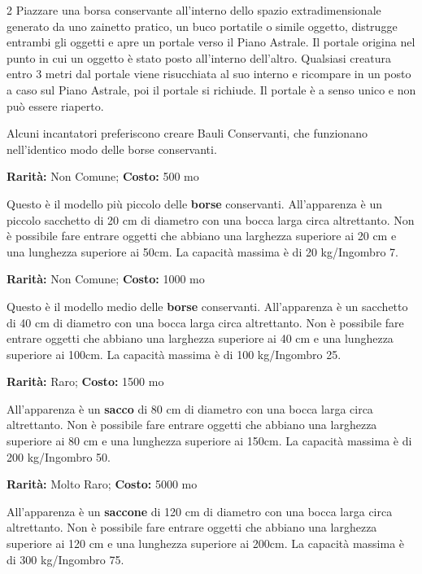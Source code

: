 \begin{multicols}{2}
Piazzare una borsa conservante all'interno dello spazio extradimensionale generato da uno zainetto pratico, un buco portatile o simile oggetto, distrugge entrambi gli oggetti e apre un portale verso il Piano Astrale. Il portale origina nel punto in cui un oggetto è stato posto all'interno dell'altro. Qualsiasi creatura entro 3 metri dal portale viene risucchiata al suo interno e ricompare in un posto a caso sul Piano Astrale, poi il portale si richiude. Il portale è a senso unico e non può essere riaperto.

Alcuni incantatori preferiscono creare Bauli Conservanti, che funzionano nell'identico modo delle borse conservanti.


\textbf{Rarità:} Non Comune; \textbf{Costo:} 500 mo

Questo è il modello più piccolo delle \textbf{borse} conservanti. All'apparenza è un piccolo sacchetto di 20 cm di diametro con una bocca larga circa altrettanto.
Non è possibile fare entrare oggetti che abbiano una larghezza superiore ai 20 cm e una lunghezza superiore ai 50cm.
La capacità massima è di 20 kg/Ingombro 7.


\textbf{Rarità:} Non Comune; \textbf{Costo:} 1000 mo

Questo è il modello medio delle \textbf{borse} conservanti. All'apparenza è un sacchetto di 40 cm di diametro con una bocca larga circa altrettanto.
Non è possibile fare entrare oggetti che abbiano una larghezza superiore ai 40 cm e una lunghezza superiore ai 100cm.
La capacità massima è di 100 kg/Ingombro 25.


\textbf{Rarità:} Raro; \textbf{Costo:} 1500 mo

All'apparenza è un \textbf{sacco} di 80 cm di diametro con una bocca larga circa altrettanto.
Non è possibile fare entrare oggetti che abbiano una larghezza superiore ai 80 cm e una lunghezza superiore ai 150cm. La capacità massima è di 200 kg/Ingombro 50.


\textbf{Rarità:} Molto Raro; \textbf{Costo:} 5000 mo

All'apparenza è un \textbf{saccone} di 120 cm di diametro con una bocca larga circa altrettanto.
Non è possibile fare entrare oggetti che abbiano una larghezza superiore ai 120 cm e una lunghezza superiore ai 200cm. La capacità massima è di 300 kg/Ingombro 75.


\end{multicols}
